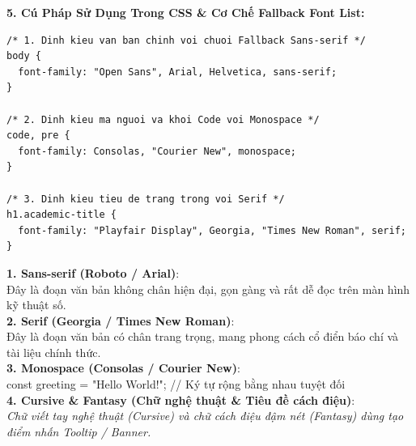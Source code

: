 \documentclass[11pt,oneside]{book}
\begin{document}
\textbf{5. Cú Pháp Sử Dụng Trong CSS \& Cơ Chế Fallback Font List:}

\begin{codeWindow}
\begin{lstlisting}[language=CSS3]
/* 1. Dinh kieu van ban chinh voi chuoi Fallback Sans-serif */
body {
  font-family: "Open Sans", Arial, Helvetica, sans-serif;
}

/* 2. Dinh kieu ma nguoi va khoi Code voi Monospace */
code, pre {
  font-family: Consolas, "Courier New", monospace;
}

/* 3. Dinh kieu tieu de trang trong voi Serif */
h1.academic-title {
  font-family: "Playfair Display", Georgia, "Times New Roman", serif;
}
\end{lstlisting}
\end{codeWindow}

\begin{browserWindow}
\vspace{2pt}
\begin{tcolorbox}[
    enhanced,
    colback=white,
    colframe=gray!30,
    arc=6pt, boxrule=0.8pt,
    top=10pt, bottom=10pt, left=12pt, right=12pt
]
  {\sffamily\bfseries\color{primaryBlue} 1. Sans-serif (Roboto / Arial)}:\\[2pt]
  {\sffamily Đây là đoạn văn bản không chân hiện đại, gọn gàng và rất dễ đọc trên màn hình kỹ thuật số.}\\[8pt]
  
  {\sffamily\bfseries\color{primaryBlue} 2. Serif (Georgia / Times New Roman)}:\\[2pt]
  {\rmfamily Đây là đoạn văn bản có chân trang trọng, mang phong cách cổ điển báo chí và tài liệu chính thức.}\\[8pt]
  
  {\sffamily\bfseries\color{primaryBlue} 3. Monospace (Consolas / Courier New)}:\\[2pt]
  {\ttfamily const greeting = "Hello World!"; // Ký tự rộng bằng nhau tuyệt đối}\\[8pt]
  
  {\sffamily\bfseries\color{primaryBlue} 4. Cursive \& Fantasy (Chữ nghệ thuật \& Tiêu đề cách điệu)}:\\[2pt]
  {\sffamily\small\color{purple!80!black}\textit{Chữ viết tay nghệ thuật (Cursive) và chữ cách điệu đậm nét (Fantasy) dùng tạo điểm nhấn Tooltip / Banner.}}
\end{tcolorbox}
\end{browserWindow}
\end{document}
